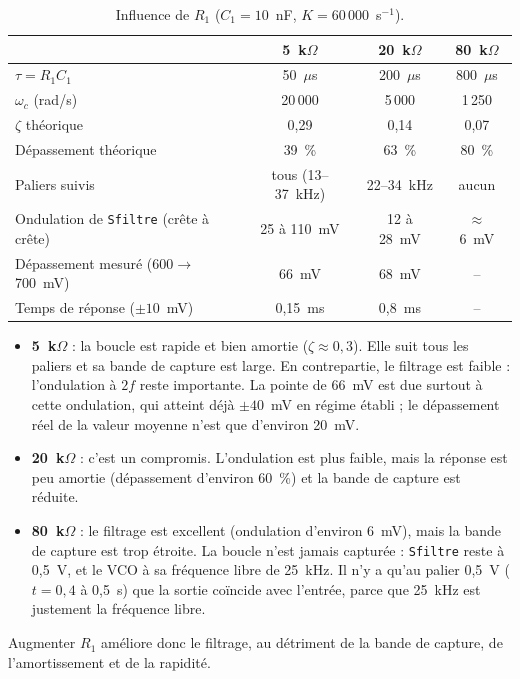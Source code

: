 \begin{table}[H]
\centering
\caption{Influence de $R_1$ ($C_1 = 10$~nF, $K = 60\,000$~s$^{-1}$).}
\label{tab:R}
\begin{tabular}{lccc}
\toprule
 & 5~k$\Omega$ & 20~k$\Omega$ & 80~k$\Omega$\\
\midrule
$\tau = R_1C_1$ & 50~$\mu$s & 200~$\mu$s & 800~$\mu$s\\
$\omega_c$ (rad/s) & 20\,000 & 5\,000 & 1\,250\\
$\zeta$ théorique & 0,29 & 0,14 & 0,07\\
Dépassement théorique & 39~\% & 63~\% & 80~\%\\
Paliers suivis & tous (13--37~kHz) & 22--34~kHz & aucun\\
Ondulation de \texttt{Sfiltre} (crête à crête) & 25 à 110~mV & 12 à 28~mV & $\approx$ 6~mV\\
Dépassement mesuré (600$\to$700~mV) & 66~mV & 68~mV & --\\
Temps de réponse ($\pm10$~mV) & 0,15~ms & 0,8~ms & --\\
\bottomrule
\end{tabular}
\end{table}

\begin{itemize}
  \item \textbf{5~k$\Omega$} : la boucle est rapide et bien amortie ($\zeta \approx 0{,}3$). Elle
        suit tous les paliers et sa bande de capture est large. En contrepartie, le filtrage est
        faible : l'ondulation à $2f$ reste importante. La pointe de 66~mV est due surtout à cette
        ondulation, qui atteint déjà $\pm 40$~mV en régime établi ; le dépassement réel de la
        valeur moyenne n'est que d'environ 20~mV.
  \item \textbf{20~k$\Omega$} : c'est un compromis. L'ondulation est plus faible, mais la réponse
        est peu amortie (dépassement d'environ 60~\%) et la bande de capture est réduite.
  \item \textbf{80~k$\Omega$} : le filtrage est excellent (ondulation d'environ 6~mV), mais la bande
        de capture est trop étroite. La boucle n'est jamais capturée : \texttt{Sfiltre} reste à
        0,5~V, et le VCO à sa fréquence libre de 25~kHz. Il n'y a qu'au palier 0,5~V
        ($t = 0{,}4$ à 0,5~s) que la sortie coïncide avec l'entrée, parce que 25~kHz est
        justement la fréquence libre.
\end{itemize}
Augmenter $R_1$ améliore donc le filtrage, au détriment de la bande de capture, de
l'amortissement et de la rapidité.

